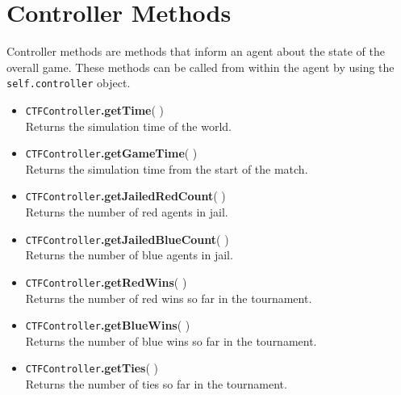\documentclass{article}
\begin{document}
\section*{Controller Methods}
Controller methods are methods that inform an agent about the state of the overall game. These methods can be called from within the agent by using the \verb|self.controller| object.
\begin{itemize}
	\item\verb|CTFController|\textbf{.getTime}( )\\
	Returns the simulation time of the world. 
	\item\verb|CTFController|\textbf{.getGameTime}( )\\
	Returns the simulation time from the start of the match.
	\item\verb|CTFController|\textbf{.getJailedRedCount}( )\\
	Returns the number of red agents in jail. 
	\item\verb|CTFController|\textbf{.getJailedBlueCount}( )\\
	Returns the number of blue agents in jail.
	\item\verb|CTFController|\textbf{.getRedWins}( )\\
	Returns the number of red wins so far in the tournament.
	\item\verb|CTFController|\textbf{.getBlueWins}( )\\
	Returns the number of blue wins so far in the tournament.
	\item\verb|CTFController|\textbf{.getTies}( )\\
	Returns the number of ties so far in the tournament. 
\end{itemize}
\end{document}
